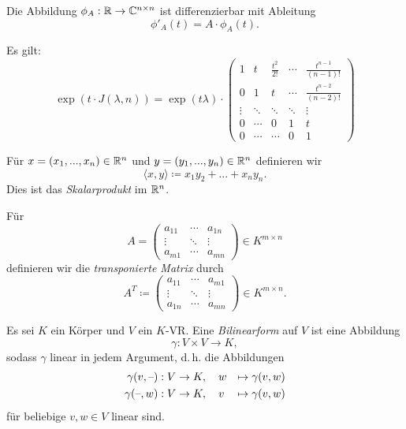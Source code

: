 \documentclass{cheat-sheet}
\begin{document}

\begin{satz}
  Die Abbildung $\phi_A : \mathbb{R} \to \mathbb{C}^{n \times n}$ ist differenzierbar mit Ableitung
  \[ \phi'_A(t) = A \cdot \phi_A(t). \]
\end{satz}


\begin{satz}
  Es gilt:
  \[ \exp(t \cdot J(\lambda, n)) = \exp(t \lambda) \cdot \begin{pmatrix}
  1 & t & \tfrac{t^2}{2!} & \cdots & \tfrac{t^{n-1}}{(n-1)!} \\
  0 & 1 & t & \cdots & \tfrac{t^{n-2}}{(n-2)!} \\
  \vdots & \ddots & \ddots & \ddots & \vdots \\
  0 & \cdots & 0 & 1 & t \\
  0 & \cdots & \cdots & 0 & 1
  \end{pmatrix} \]
\end{satz}


\begin{defn}
  Für $x = (x_1, ..., x_n) \in \mathbb{R}^n$ und $y = (y_1, ..., y_n) \in \mathbb{R}^n$ definieren wir
  \[ \langle x , y \rangle \coloneqq x_1y_2 + ... + x_ny_n. \]
  Dies ist das \emph{Skalarprodukt} im $\mathbb{R}^n$.
\end{defn}

\begin{defn}
  Für
  \[ A = \begin{pmatrix}
  a_{11} & \cdots & a_{1n} \\
  \vdots & \ddots & \vdots \\
  a_{m1} & \cdots & a_{mn}
  \end{pmatrix} \in K^{m \times n} \]
  definieren wir die \emph{transponierte Matrix} durch
  \[ A^{T} \coloneqq \begin{pmatrix}
  a_{11} & \cdots & a_{m1} \\
  \vdots & \ddots & \vdots \\
  a_{1n} & \cdots & a_{mn}
  \end{pmatrix} \in K^{m \times n}. \]
\end{defn}

\begin{defn}
  Es sei $K$ ein Körper und $V$ ein $K$-VR. Eine \emph{Bilinearform} auf $V$ ist eine Abbildung
  \[ \gamma : V \times V \to K, \]
  sodass $\gamma$ linear in jedem Argument, d.\,h. die Abbildungen
  \begin{alignat*}{2}
  \gamma(v, \text{--}) &: V \to K, \quad w & \mapsto \gamma(v, w) \\
  \gamma(\text{--}, w) &: V \to K, \quad v & \mapsto \gamma(v, w)
  \end{alignat*}
  für beliebige $v, w \in V$ linear sind.
\end{defn}
\end{document}
